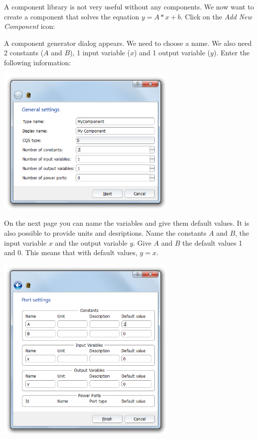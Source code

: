 \documentclass[a4paper,pdftex]{article}
\begin{document}
\begin{tutenumerate}
A component library is not very useful without any components.
We now want to create a component that solves the equation $y = A*x+b$.
Click on the \textit{Add New Component} icon:


A component generator dialog appears. 
We need to choose a name.
We also need 2 constants ($A$ and $B$), 1 input variable ($x$) and 1 output variable ($y$).
Enter the following information:

\includegraphics[width=0.65\textwidth]{gfx/writingcomponents/newcomponent1.png}

On the next page you can name the variables and give them default values.
It is also possible to provide units and desriptions.
Name the constants $A$ and $B$, the input variable $x$ and the output variable $y$.
Give $A$ and $B$ the default values 1 and 0.
This means that with default values, $y = x$.

\includegraphics[width=0.65\textwidth]{gfx/writingcomponents/newcomponent2.png}


\end{tutenumerate}
\end{document}
